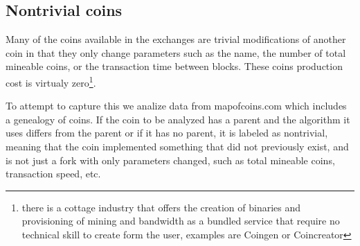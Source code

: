 \subsection{Nontrivial coins}

Many of the coins available in the exchanges are trivial modifications of another coin in that they only change parameters such as the name, the number of total mineable coins, or the transaction time between blocks.
These coins production cost is virtualy zero\footnote{ there is a cottage industry that offers the creation of binaries and provisioning of mining and bandwidth as a bundled service that require no technical skill to create form the user, examples are Coingen or Coincreator}.

To attempt to capture this we analize data from mapofcoins.com which includes a genealogy of coins.
If the coin to be analyzed has a parent and the algorithm it uses differs from the parent or if it has no parent, it is labeled as nontrivial, meaning that the coin implemented something that did not previously exist, and is not just a fork with only parameters changed, such as total mineable coins, transaction speed, etc.

